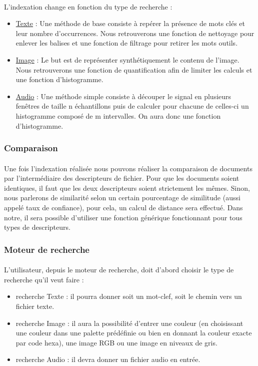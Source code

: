 \paragraph{}
\noindent L’indexation change en fonction du type de recherche :
\begin{itemize}
    \item \underline{Texte} : Une méthode de base consiste à repérer la présence de mots clés et leur nombre d'occurrences. Nous retrouverons une fonction de nettoyage pour enlever les balises et une fonction de filtrage pour retirer les mots outils.
    \item \underline{Image} : Le but est de représenter synthétiquement le contenu de l’image. Nous retrouverons une fonction de quantification afin de limiter les calculs et une fonction d’histogramme.
    \item \underline{Audio} : Une méthode simple consiste à découper le signal en plusieurs fenêtres de taille n échantillons puis de calculer pour chacune de celles-ci un histogramme composé de m intervalles. On aura donc une fonction d’histogramme.
\end{itemize}

\subsubsection{Comparaison}
\paragraph{}
Une fois l’indexation réalisée nous pouvons réaliser la comparaison de documents par l'intermédiaire des descripteurs de fichier. Pour que les documents soient identiques, il faut que les deux descripteurs soient strictement les mêmes. Sinon, nous parlerons de similarité selon un certain pourcentage de similitude (aussi appelé taux de confiance), pour cela, un calcul de distance sera effectué. Dans notre, il sera possible d’utiliser une fonction générique fonctionnant pour tous types de descripteurs.

\subsubsection{Moteur de recherche}
\paragraph{}
L’utilisateur, depuis le moteur de recherche, doit d’abord choisir le type de recherche qu’il veut faire :
\begin{itemize}
    \item recherche Texte : il pourra donner soit un mot-clef, soit le chemin vers un fichier texte.
    \item recherche Image : il aura la possibilité d’entrer une couleur (en choisissant une couleur dans une palette prédéfinie ou bien en donnant la couleur exacte par code hexa), une image RGB ou une image en niveaux de gris.
    \item recherche Audio : il devra donner un fichier audio en entrée.
\end{itemize}

